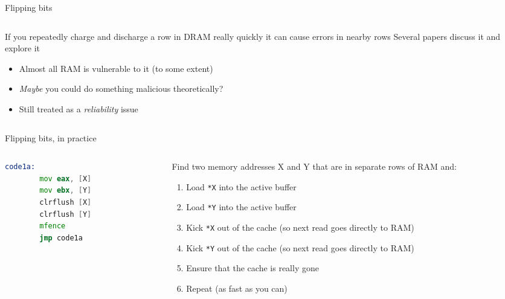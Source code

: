 \documentclass[9pt,aspectratio=169]{beamer}
\begin{document}
\begin{frame}[label={sec:org441a6ba}]{Flipping bits}
\begin{columns}
\begin{column}[t]{0.49\columnwidth}
\begin{block}{If you repeatedly charge and discharge a row in DRAM really quickly it can cause errors in nearby rows}
Several papers discuss it and explore it
\begin{itemize}
\item Almost all RAM is vulnerable to it (to some extent)
\item \emph{Maybe} you could do something malicious theoretically?
\item Still treated as a \emph{reliability} issue
\end{itemize}
\end{block}
\end{column}
\end{columns}
\end{frame}

\begin{frame}[label={sec:org2d405b1},fragile]{Flipping bits, in practice}
 \begin{columns}
\begin{column}[t]{0.49\columnwidth}
\begin{lstlisting}[language=asm,numbers=none]
code1a:
        mov eax, [X]
        mov ebx, [Y]
        clrflush [X]
        clrflush [Y]
        mfence
        jmp code1a
\end{lstlisting}
\end{column}

\begin{column}[t]{0.49\columnwidth}
Find two memory addresses X and Y that are in separate rows of RAM and:
\begin{enumerate}
\item Load \texttt{*X} into the active buffer
\item Load \texttt{*Y} into the active buffer
\item Kick \texttt{*X} out of the cache (so next read goes directly to RAM)
\item Kick \texttt{*Y} out of the cache (so next read goes directly to RAM)
\item Ensure that the cache is really gone
\item Repeat (as fast as you can)
\end{enumerate}
\end{column}
\end{columns}
\end{frame}
\end{document}
